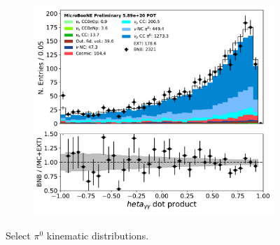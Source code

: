 \begin{figure}[H]
\begin{center}
\begin{subfigure}[b]{0.3\textwidth}
    \caption{}
    \end{subfigure}
    \begin{subfigure}[b]{0.3\textwidth}
    \centering
    \includegraphics[width=1.00\textwidth]{pi0/kinematics/pi0_gammadot_03112020_ALL_scaled.pdf}
    \caption{}
    \end{subfigure}
\caption{Select $\pi^0$ kinematic distributions.}
\label{fig:pi0:kinematics:A}
\end{center}
\end{figure}

